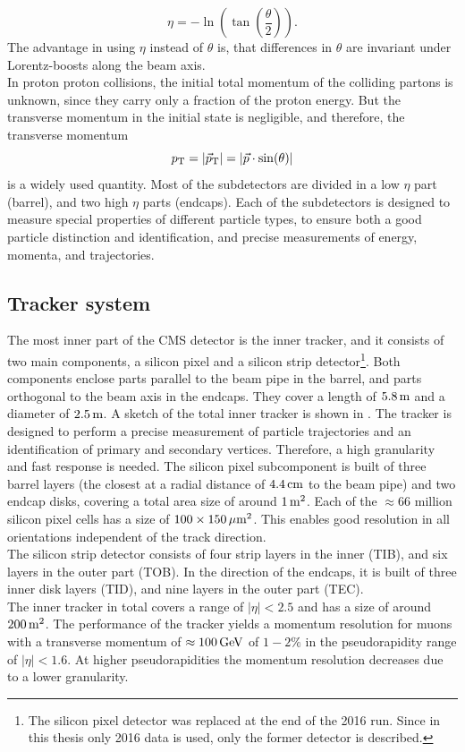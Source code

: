 \begin{equation}
 \eta=-\ln\left(\tan\left(\frac{\theta}{2}\right)\right).
\end{equation}
The advantage in using $\eta$ instead of $\theta$ is, that differences in $\theta$ are invariant under Lorentz-boosts along the beam axis.\\
In proton proton collisions, the initial total momentum of the colliding partons is unknown, since they carry only a fraction of the proton energy. But the transverse momentum in the initial state is negligible, and therefore, the transverse momentum
\begin{equation}
 p_{\mathrm{T}}=|{\vec p}_{\mathrm{T}}|=|\vec{p}\cdot\sin(\theta)|
\end{equation}
is a widely used quantity.
Most of the subdetectors are divided in a low $\eta$ part (barrel), and two high $\eta$ parts (endcaps). Each of the subdetectors is designed to measure special properties of different particle types, to ensure both a good particle distinction and identification, and precise measurements of energy, momenta, and trajectories.



\subsection{Tracker system}
The most inner part of the CMS detector is the inner tracker, and it consists of two main components, a silicon pixel and a silicon strip detector\footnote{The silicon pixel detector was replaced at the end of the 2016 run. Since in this thesis only 2016 data is used, only the former detector is described.}. Both components enclose parts parallel to the beam pipe in the barrel, and parts orthogonal to the beam axis in the endcaps. They cover a length of $5.8\,\text{m}$ and a diameter of $2.5\,\text{m}$. A sketch of the total inner tracker is shown in . The tracker is designed to perform a precise measurement of particle trajectories and an identification of primary and secondary vertices. Therefore, a high granularity and fast response is needed. The silicon pixel subcomponent is built of three barrel layers (the closest at a radial distance of $4.4\,\text{cm}$ to the beam pipe) and two endcap disks, covering a total area size of around $1\,\text{m}^2$. Each of the $\approx66$ million silicon pixel cells has a size of $100\times150\,\mu\text{m}^2$. This enables good resolution in all orientations independent of the track direction.\\
The silicon strip detector consists of four strip layers in the inner (TIB), and six layers in the outer part (TOB). In the direction of the endcaps, it is built of three inner disk layers (TID), and nine layers in the outer part (TEC).\\
The inner tracker in total covers a range of $|\eta|<2.5$ and has a size of around $200\,\text{m}^2$. The performance of the tracker yields a momentum resolution for muons with a transverse momentum of $\approx100\,\text{Ge\hspace{-.08em}V}$ of $1-2\%$ in the pseudorapidity range of $|\eta|<1.6$. At higher pseudorapidities the momentum resolution decreases due to a lower granularity.

